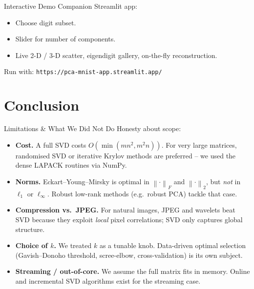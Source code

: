 \documentclass[10pt,aspectratio=169]{beamer}
\newcommand{\norm}[1]{\left\|#1\right\|}
\begin{document}
\begin{frame}{Interactive Demo}
  Companion Streamlit app:
  \begin{itemize}
    \item Choose digit subset.
    \item Slider for number of components.
    \item Live 2-D / 3-D scatter, eigendigit gallery, on-the-fly reconstruction.
  \end{itemize}
  Run with: \quad \texttt{https://pca-mnist-app.streamlit.app/}
\end{frame}

\section{Conclusion}

\begin{frame}{Limitations \& What We Did Not Do}
  Honesty about scope:
  \begin{itemize}
    \item \textbf{Cost.} A full SVD costs $O(\min(mn^2, m^2 n))$. For very large matrices, randomised SVD or iterative Krylov methods are preferred -- we used the dense LAPACK routines via NumPy.
    \item \textbf{Norms.} Eckart--Young--Mirsky is optimal in $\norm{\cdot}_F$ and $\norm{\cdot}_2$, but \emph{not} in $\ell_1$ or $\ell_\infty$. Robust low-rank methods (e.g.\ robust PCA) tackle that case.
    \item \textbf{Compression vs.\ JPEG.} For natural images, JPEG and wavelets beat SVD because they exploit \emph{local} pixel correlations; SVD only captures global structure.
    \item \textbf{Choice of $k$.} We treated $k$ as a tunable knob. Data-driven optimal selection (Gavish--Donoho threshold, scree-elbow, cross-validation) is its own subject.
    \item \textbf{Streaming / out-of-core.} We assume the full matrix fits in memory. Online and incremental SVD algorithms exist for the streaming case.
  \end{itemize}
\end{frame}
\end{document}
